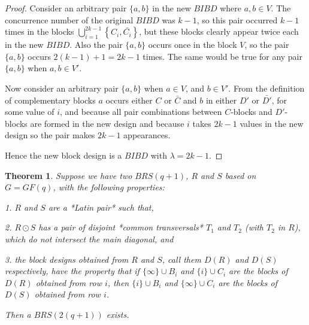 \documentclass[
  11pt,
  a4paper]{book}
\newtheorem{theorem}{Theorem}
\begin{document}
\begin{proof}
Consider an arbitrary pair $\{a, b\}$ in the new $BIBD$ where
$a, b \in V$. The concurrence number of the original $BIBD$
was $k - 1$, so this pair occurred $k - 1$ times in the blocks
$\bigcup\limits_{i = 1}^{2k - 1} \left\{C_i, \bar{C_i} \right\}$,
but these blocks clearly appear twice each in the new
$BIBD$. Also the pair $\{a, b\}$ occurs once in the block
$V$, so the pair $\{a, b\}$ occurs $2(k - 1) + 1 = 2k - 1$ times.
The same would be true for any pair $\{a, b\}$ when $a, b \in V'$.

Now consider an arbitrary pair $\{a, b\}$ when $a \in V$, and
$b \in V'$.  From the definition of complementary blocks $a$
occurs either $C$ or $\bar{C}$ and $b$ in either $D'$ or
$\bar{D'}$, for some value of $i$, and because all pair
combinations between $C$-blocks and $D'$-blocks are formed
in the new design and because $i$ takes $2k - 1$ values in the
new design so the pair makes $2k - 1$ appearances.

Hence the new block design is a $BIBD$ with $\lambda = 2k - 1$.
\end{proof}

\begin{theorem}
Suppose we have two $BRS(q+1)$, $R$ and $S$ based on
$G = GF(q)$, with the following properties:

  1.  $R$ and $S$ are a *Latin pair* such that,

  2.  $R \odot S$ has a pair of disjoint *common transversals*
      $T_1$ and $T_2$ (with $T_2$ in $R$), which do not
      intersect the main diagonal, and

  3.  the block designs obtained from $R$ and $S$, call them
      $D(R)$ and $D(S)$ respectively, have the property that
      if $\{\infty\} \cup B_i$ and $\{i\} \cup C_i$ are the
      blocks of $D(R)$ obtained from row $i$, then $\{i\} \cup
      B_i$ and $\{\infty\} \cup C_i$ are the blocks of $D(S)$
      obtained from row $i$.

Then a $BRS(2(q + 1))$ exists.
\end{theorem}
\end{document}
